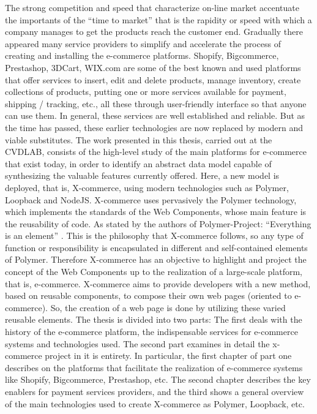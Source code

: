 The strong competition and speed that characterize on-line market
accentuate the importants of the “time to market” that is the rapidity or speed with which a company manages to get the products reach the customer end.
\newline
Gradually there appeared many service providers to simplify and accelerate the process of creating and installing the e-commerce platforms.
\newline
Shopify, Bigcommerce, Prestashop, 3DCart, WIX.com are some of the best known and used platforms that offer services to insert, edit and delete products, manage inventory, create collections of products, putting one or more services available for payment, shipping / tracking, etc., all these through user-friendly interface so that anyone can use them.
\newline
In general, these services are well established and reliable.
But as the time has passed, these earlier technologies are now replaced by modern and viable substitutes.
\newline
The work presented in this thesis, carried out at the CVDLAB, consists of the high-level study of the main platforms for e-commerce that exist today, in order to identify an abstract data model capable of synthesizing the valuable features currently offered. Here, a new model is deployed, that is, X-commerce, using modern technologies such as Polymer, Loopback and NodeJS.
\newline
X-commerce uses pervasively the Polymer technology, which implements the standards of the Web Components, whose main feature is the reusability of code. As stated by the authors of Polymer-Project: “Everything is an element” \cite{polymer_world_view}. This is the philosophy that X-commerce follows, so any type of function or responsibility is encapsulated in different and self-contained elements of Polymer. Therefore X-commerce has an objective to highlight and project the concept of the Web Components up to the realization of a large-scale platform, that is, e-commerce.
\newline
X-commerce aims to provide developers with a new method, based on reusable components, to compose their own web pages (oriented to e-commerce). So, the creation of a web page is done by utilizing these varied reusable elements.
\newline
The thesis is divided into two parts: The first deals with the history of the e-commerce platform, the indispensable services for e-commerce systems and technologies used. The second part examines in detail the x-commerce project in it is entirety. In particular, the first chapter of part one describes on the platforms that facilitate the realization of e-commerce systems like Shopify, Bigcommerce, Prestashop, etc. The second chapter describes the key enablers for payment services providers, and the third shows a general overview of the main technologies used to create X-commerce as Polymer, Loopback, etc.
